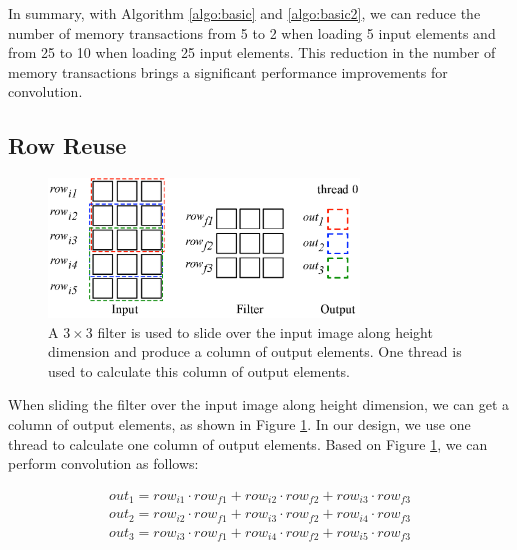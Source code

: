 In summary, with Algorithm \ref{algo:basic} and \ref{algo:basic2}, we can reduce the number of memory transactions from 5 to 2 when loading
5 input elements and from 25 to 10 when loading 25 input elements. This reduction in the number of memory transactions brings a significant
performance improvements for convolution.

\subsection{Row Reuse\label{sec:rowreuse}}
\begin{figure}
	\centering
	\includegraphics[width=\columnwidth,height=3.7cm]{./figure/rowreuse.eps}
\caption{A $3 \times 3$ filter is used to slide over the input image along height dimension and produce a column of output elements. One thread is used to calculate this column of output elements.}
\label{fig:rowreuse}
\end{figure}

When sliding the filter over the input image along height dimension, we can get a column of output elements, as shown in Figure
\ref{fig:rowreuse}. In our design, we use one thread to calculate one column of output elements. Based on Figure \ref{fig:rowreuse},
we can perform convolution as follows:

\begin{gather*}
  out_1=row_{i1} \cdot row_{f1} + row_{i2} \cdot row_{f2} + row_{i3} \cdot row_{f3} \\
out_{2}=row_{i2} \cdot row_{f1} + row_{i3} \cdot row_{f2} + row_{i4} \cdot row_{f3} \\
	out_{3}=row_{i3} \cdot row_{f1} + row_{i4} \cdot row_{f2} + row_{i5} \cdot row_{f3}
\end{gather*}

